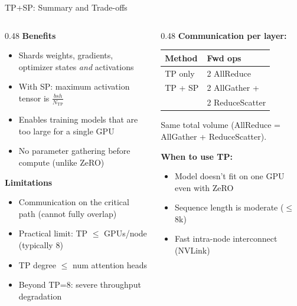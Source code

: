 \begin{frame}{TP+SP: Summary and Trade-offs}

  \begin{columns}
    \begin{column}{0.48\textwidth}
      \textbf{Benefits}
      \begin{itemize}
        \item Shards weights, gradients, optimizer states \emph{and} activations
        \item With SP: maximum activation tensor is $\frac{bsh}{N_{\text{TP}}}$
        \item Enables training models that are too large for a single GPU
        \item No parameter gathering before compute (unlike ZeRO)
      \end{itemize}

      \vspace{0.3em}
      \textbf{Limitations}
      \begin{itemize}
        \item Communication on the critical path (cannot fully overlap)
        \item Practical limit: TP $\leq$ GPUs/node (typically 8)
        \item TP degree $\leq$ num attention heads
        \item Beyond TP=8: severe throughput degradation
      \end{itemize}
    \end{column}
    \begin{column}{0.48\textwidth}
      \textbf{Communication per layer:}\\[0.3em]
      {\small
      \begin{tabular}{l l}
        \toprule
        \textbf{Method} & \textbf{Fwd ops} \\
        \midrule
        TP only & 2 AllReduce \\
        TP + SP & 2 AllGather + \\
                & 2 ReduceScatter \\
        \bottomrule
      \end{tabular}

      \vspace{0.2em}
      Same total volume (AllReduce = AllGather + ReduceScatter).
      }

      \vspace{0.5em}
      \textbf{When to use TP:}
      \begin{itemize}
        \item Model doesn't fit on one GPU even with ZeRO
        \item Sequence length is moderate ($\leq$8k)
        \item Fast intra-node interconnect (NVLink)
      \end{itemize}


\end{column}
\end{columns}
\end{frame}

